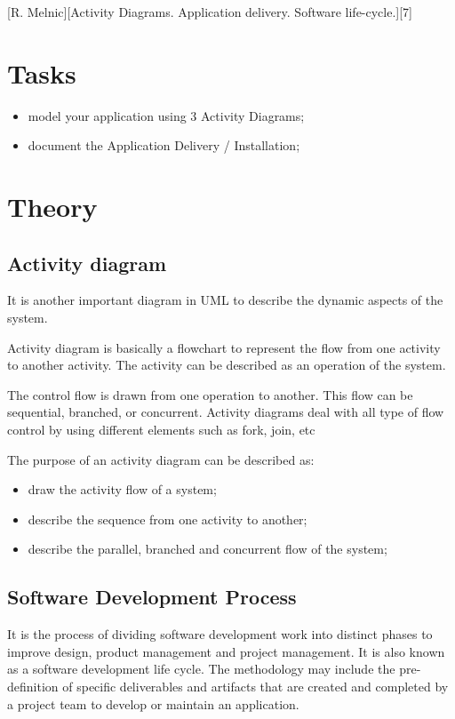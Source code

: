 \documentclass{article}
\begin{document}
	[R. Melnic][Activity Diagrams. Application delivery. Software life-cycle.][7]

	\section{Tasks}
		\begin{itemize}
			\item model your application using 3 Activity Diagrams;
			\item document the Application Delivery / Installation;
		\end{itemize}

	\section{Theory}
		\subsection{Activity diagram}
			It is another important diagram in UML to describe the dynamic aspects of the system.

			Activity diagram is basically a flowchart to represent the flow from one activity to another activity. The activity can be described as an operation of the system.

			The control flow is drawn from one operation to another. This flow can be sequential, branched, or concurrent. Activity diagrams deal with all type of flow control by using different elements such as fork, join, etc

			\bigskip
			The purpose of an activity diagram can be described as:
			\begin{itemize}
				\item draw the activity flow of a system;
				\item describe the sequence from one activity to another;
				\item describe the parallel, branched and concurrent flow of the system;
			\end{itemize}

		\subsection{Software Development Process}
			It is the process of dividing software development work into distinct phases to improve design, product management and project management. It is also known as a software development life cycle. The methodology may include the pre-definition of specific deliverables and artifacts that are created and completed by a project team to develop or maintain an application.
\end{document}
